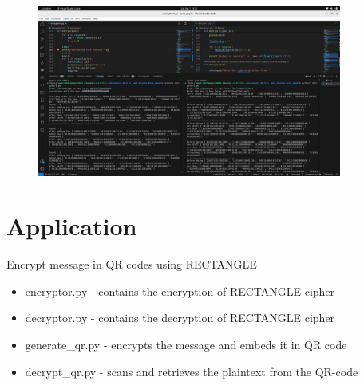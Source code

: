\documentclass[journal=tosc,preprint]{iacrtrans}
\begin{document}
\begin{figure}[htp]
    \centering
    \includegraphics[width=10cm]{decryptor.jpg}
\end{figure}


\section{Application}
 Encrypt message in QR codes using RECTANGLE
    \begin{itemize}
        \item encryptor.py - contains the encryption of RECTANGLE cipher 
        \item decryptor.py - contains the decryption of RECTANGLE cipher
        \item generate\_qr.py - encrypts the message and embeds it in QR code
        \item decrypt\_qr.py - scans and retrieves the plaintext from the QR-code
    \end{itemize}
    
\end{document}
